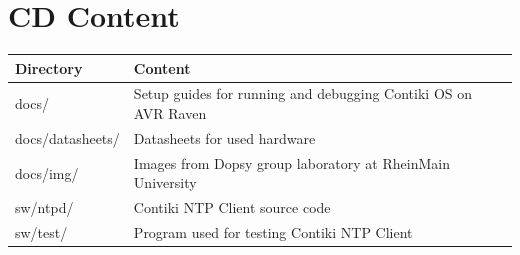 \chapter{CD Content} %
\begin{tabular}{|l|l|}
	\hline
	Directory & Content \\ \hline
	docs/ & Setup guides for running and debugging Contiki OS on AVR Raven\\
	docs/datasheets/ & Datasheets for used hardware\\
	docs/img/ & Images from Dopsy group laboratory at RheinMain University\\
	sw/ntpd/ & Contiki NTP Client source code\\
	sw/test/ & Program used for testing Contiki NTP Client\\
	\hline
\end{tabular}
